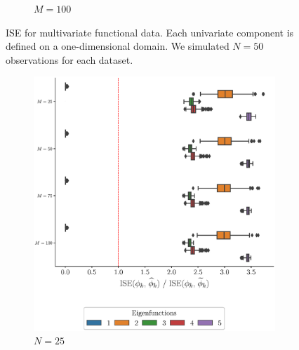 \begin{results}
\begin{figure}
\begin{subfigure}[b]{0.49\textwidth}
         \caption{$M = 100$}
         \label{fig:ise_mfd_1d_100}
    \end{subfigure}
    \caption{ISE for multivariate functional data. Each univariate component is defined on a one-dimensional domain. We simulated $N = 50$ observations for each dataset.}
    \label{fig:ise_mfd_1d}
\end{figure}

\begin{figure}
     \centering
     \begin{subfigure}[b]{0.49\textwidth}
         \centering
         \includegraphics[width=\textwidth]{figures/scenario_2/ise_N25.eps}
         \caption{$N = 25$}
         \label{fig:ise_mfd_2d_25}
     \end{subfigure}
     \hfill
     \begin{subfigure}[b]{0.49\textwidth}
         \centering

\end{subfigure}
\end{figure}
\end{results}
